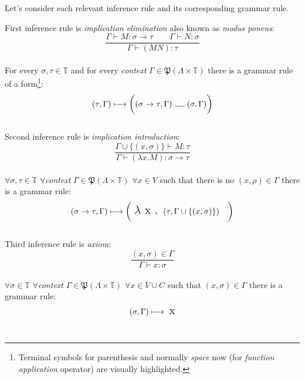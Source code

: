 \documentclass[12pt,a4paper]{report}
\newcommand\Vtextvisiblespace[1][.3em]{%
  \mbox{\kern.06em\vrule height.3ex}%
  \vbox{\hrule width#1}%
  \hbox{\vrule height.3ex}}
\begin{document}
Let's consider each relevant inference rule and its corresponding grammar rule.

First inference rule is {\it implication elimination} also known as 
{\it modus ponens}: 
\[
	\frac{\Gamma \vdash M : \sigma \rightarrow \tau \qquad
		  \Gamma \vdash N : \sigma }
	     {\Gamma \vdash (M N) : \tau }
\]
\\
For every $\sigma, \tau \in \mathbb{T}$ and for every {\it context} 
$\Gamma \in \mathfrak P \left({\Lambda \times  \mathbb{T}}\right)$ there is a grammar rule of a form\footnote{ 
Terminal symbols for parenthesis and normally {\it space} now \textvisiblespace \quad (for {\it function application} operator) are visually highlighted. }: 
\[	
	( \tau , \Gamma )  \longmapsto
	\bigg( ( \sigma \rightarrow \tau , \Gamma ) 
	  \mbox{ \Vtextvisiblespace[1em] } ( \sigma , \Gamma ) \bigg)
\]
\\

Second inference rule is {\it implication introduction}: 
\[
	\frac{\Gamma \cup \{ ( x,\sigma ) \} \vdash M : \tau }
	     {\Gamma \vdash (\lambda x . M) : \sigma \rightarrow \tau }
\]
\\
$\forall \sigma, \tau \in \mathbb{T}$ 
$\forall${\it context} $\Gamma \in \mathfrak P \left({\Lambda \times  \mathbb{T}}\right) $ 
$\forall x \in V $ such that there is no $(x,\rho) \in \Gamma$ 
there is a grammar rule:
\[ 
	( \sigma \rightarrow \tau , \Gamma )  \longmapsto
	\bigg( \mbox{ {\Large $\lambda$ x . }}( \tau , \Gamma \cup \{ (x,\sigma) \} ) \quad \bigg)
\]
\\	

Third inference rule is {\it axiom}: 
\[
		\frac{( x , \sigma )  \in \Gamma}
		     {\Gamma \vdash x : \sigma}
\]
\\
$\forall \sigma \in \mathbb{T}$ 
$\forall${\it context} $\Gamma \in \mathfrak P \left({\Lambda \times  \mathbb{T}}\right) $ 
$\forall x \in V \cup C $ such that $(x,\sigma) \in \Gamma$ 
there is a grammar rule:
\[ 
	( \sigma , \Gamma )  \longmapsto \mbox{ {\Large x}}
\]
\\
\end{document}
